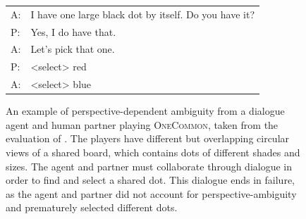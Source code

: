 \documentclass[11pt]{article}
\begin{document}
\begin{figure}[t!]
\setlength{\abovecaptionskip}{0pt}

\centering


\vspace{1em}

\small
\begin{tabular}[b]{@{}l@{}l@{}}
\toprule
{\color{blue} A}:\;&I have one large black dot by itself. Do you have it? \\
{\color{red} P}:\;&Yes, I do have that. \\
{\color{blue} A}:\;&Let's pick that one. \\
{\color{red} P}:\;&<select> {\color{red} red} \\
{\color{blue} A}:\;&<select> {\color{blue} blue}\\
\bottomrule
\end{tabular}

\vspace{1em}

\caption{
An example of perspective-dependent ambiguity from a dialogue {\color{blue}agent} and human {\color{red}partner} playing \textsc{OneCommon}, taken from the evaluation of \citet{fried}.
The players have different but overlapping circular views of a shared board,
which contains dots of different shades and sizes.
The agent and partner must collaborate through dialogue in order to find and
select a shared dot.
This dialogue ends in failure, as the agent and partner did not account for perspective-ambiguity and prematurely selected different dots.
}
\label{fig:oc}
\end{figure}
\end{document}
